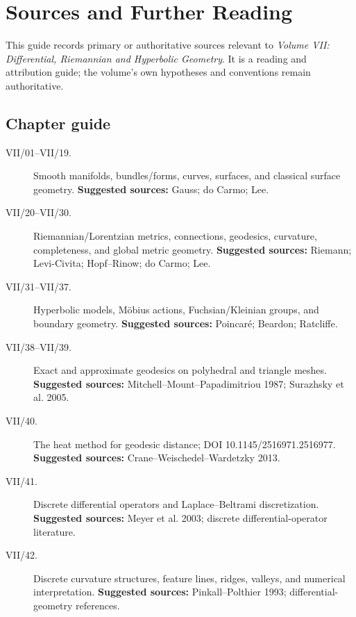 \chapter*{Sources and Further Reading}
{}

This guide records primary or authoritative sources relevant to \emph{Volume VII: Differential, Riemannian and Hyperbolic Geometry}.
It is a reading and attribution guide; the volume's own hypotheses and conventions remain authoritative.

\section*{Chapter guide}
\begin{description}
\item[VII/01--VII/19.] Smooth manifolds, bundles/forms, curves, surfaces, and classical surface geometry.
\textbf{Suggested sources:} Gauss; do Carmo; Lee.

\item[VII/20--VII/30.] Riemannian/Lorentzian metrics, connections, geodesics, curvature, completeness, and global metric geometry.
\textbf{Suggested sources:} Riemann; Levi-Civita; Hopf--Rinow; do Carmo; Lee.

\item[VII/31--VII/37.] Hyperbolic models, Möbius actions, Fuchsian/Kleinian groups, and boundary geometry.
\textbf{Suggested sources:} Poincaré; Beardon; Ratcliffe.

\item[VII/38--VII/39.] Exact and approximate geodesics on polyhedral and triangle meshes.
\textbf{Suggested sources:} Mitchell--Mount--Papadimitriou 1987; Surazhsky et al. 2005.

\item[VII/40.] The heat method for geodesic distance; DOI 10.1145/2516971.2516977.
\textbf{Suggested sources:} Crane--Weischedel--Wardetzky 2013.

\item[VII/41.] Discrete differential operators and Laplace--Beltrami discretization.
\textbf{Suggested sources:} Meyer et al. 2003; discrete differential-operator literature.

\item[VII/42.] Discrete curvature structures, feature lines, ridges, valleys, and numerical interpretation.
\textbf{Suggested sources:} Pinkall--Polthier 1993; differential-geometry references.

\end{description}

